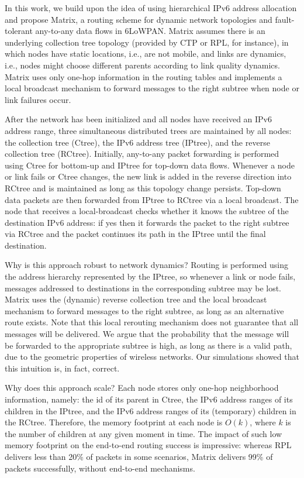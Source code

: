 In this work, we build upon the idea of using hierarchical IPv6
address allocation and propose Matrix, a routing scheme for dynamic
network topologies and fault-tolerant any-to-any data flows in
6LoWPAN. Matrix assumes there is an underlying collection tree
topology (provided by CTP or RPL, for instance), in which nodes have
static locations, i.e., are not mobile, and links are dynamics,
i.e., nodes might choose different parents according to link quality
dynamics. Matrix uses only one-hop information in the routing tables
and implements a local broadcast mechanism to forward messages to
the right subtree when node or link failures occur.

After the network has been initialized and all nodes
have received an IPv6 address range, three simultaneous distributed trees are
maintained by all nodes:
the collection tree (Ctree), the IPv6 address tree (IPtree), and the
reverse collection tree (RCtree).
Initially, any-to-any packet forwarding is performed using Ctree for
bottom-up and IPtree for top-down data flows. Whenever a node or
link fails or Ctree changes, the new link is added in the reverse
direction into RCtree and is maintained as long as this topology
change persists. Top-down data packets are then forwarded from
IPtree to RCtree via a local broadcast. The node that receives a
local-broadcast checks whether it knows the subtree of the
destination IPv6 address: if yes then it forwards the packet to the
right subtree via RCtree and the packet continues its path in the
IPtree until the final destination.


Why is this approach robust to network dynamics? Routing is
performed using the address hierarchy represented by the IPtree, so
whenever a link or node fails, messages addressed to destinations in
the corresponding subtree may be lost. Matrix uses the (dynamic)
reverse collection tree and the local broadcast mechanism to forward
messages to the right subtree, as long as an alternative route
exists. Note that this local rerouting mechanism does not
guarantee that all messages will be delivered. We argue that the probability that the message
will be forwarded to the appropriate subtree is
high, as long as there is a valid path, due to the geometric properties of wireless
networks. Our simulations showed that this intuition is, in fact, correct.


Why does this approach scale? Each node stores only one-hop
neighborhood information, namely: the id of its parent in Ctree, the
IPv6 address ranges of its children in the IPtree, and the IPv6
address ranges of its (temporary) children in the RCtree. Therefore,
the memory footprint at each node is $O(k)$, where $k$ is the number
of children at any given moment in time. The impact of such low
memory footprint on the end-to-end routing success is impressive:
whereas RPL delivers less than 20\% of packets in some
scenarios, Matrix delivers 99\% of packets
successfully, without end-to-end mechanisms.


